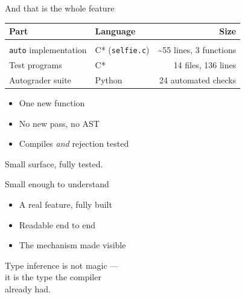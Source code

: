 \documentclass[aspectratio=169]{beamer}
\begin{document}
\begin{frame}{And that is the whole feature}
  \begin{center}
    \begin{tabular}{l l r}
      \textbf{Part} & \textbf{Language} & \textbf{Size} \\[0.4em]
      \hline \\[-0.8em]
      \texttt{auto} implementation & C* (\texttt{selfie.c}) & \textasciitilde55 lines, 3 functions \\
      Test programs                & C*                     & 14 files, 136 lines \\
      Autograder suite             & Python                 & 24 automated checks \\
    \end{tabular}
  \end{center}

  \vfill

  \begin{itemize}
    \item One new function
    \item No new pass, no AST
    \item Compiles \emph{and} rejection tested
  \end{itemize}

  \vfill

  \begin{center}
    \alert{Small surface, fully tested.}
  \end{center}
\end{frame}

\begin{frame}{Small enough to understand}
  \begin{itemize}
    \item A real feature, fully built
    \item Readable end to end
    \item The mechanism made visible
  \end{itemize}

  \vfill

  \begin{center}
    \Large
    Type inference is not magic ---\\[0.3em]
    it is the type the compiler\\
    \alert{already had.}
  \end{center}
\end{frame}
\end{document}
